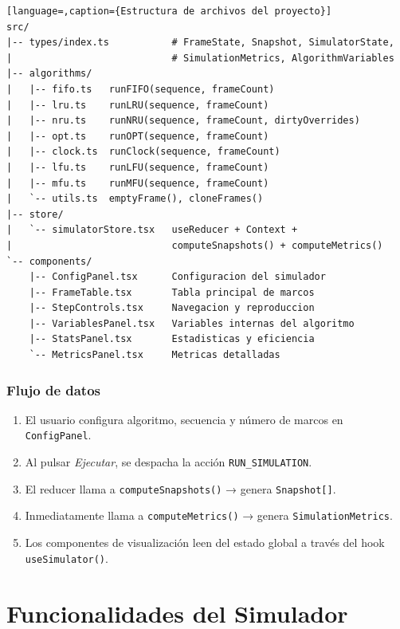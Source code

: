 \documentclass[12pt, a4paper]{article}
\begin{document}
\begin{lstlisting}[language=,caption={Estructura de archivos del proyecto}]
src/
|-- types/index.ts           # FrameState, Snapshot, SimulatorState,
|                            # SimulationMetrics, AlgorithmVariables
|-- algorithms/
|   |-- fifo.ts   runFIFO(sequence, frameCount)
|   |-- lru.ts    runLRU(sequence, frameCount)
|   |-- nru.ts    runNRU(sequence, frameCount, dirtyOverrides)
|   |-- opt.ts    runOPT(sequence, frameCount)
|   |-- clock.ts  runClock(sequence, frameCount)
|   |-- lfu.ts    runLFU(sequence, frameCount)
|   |-- mfu.ts    runMFU(sequence, frameCount)
|   `-- utils.ts  emptyFrame(), cloneFrames()
|-- store/
|   `-- simulatorStore.tsx   useReducer + Context +
|                            computeSnapshots() + computeMetrics()
`-- components/
    |-- ConfigPanel.tsx      Configuracion del simulador
    |-- FrameTable.tsx       Tabla principal de marcos
    |-- StepControls.tsx     Navegacion y reproduccion
    |-- VariablesPanel.tsx   Variables internas del algoritmo
    |-- StatsPanel.tsx       Estadisticas y eficiencia
    `-- MetricsPanel.tsx     Metricas detalladas
\end{lstlisting}

\subsubsection{Flujo de datos}

\begin{enumerate}
  \item El usuario configura algoritmo, secuencia y número de marcos en \texttt{ConfigPanel}.
  \item Al pulsar \textit{Ejecutar}, se despacha la acción \texttt{RUN\_SIMULATION}.
  \item El reducer llama a \texttt{computeSnapshots()} → genera \texttt{Snapshot[]}.
  \item Inmediatamente llama a \texttt{computeMetrics()} → genera \texttt{SimulationMetrics}.
  \item Los componentes de visualización leen del estado global a través del hook \texttt{useSimulator()}.
\end{enumerate}

\section{Funcionalidades del Simulador}
\end{document}
